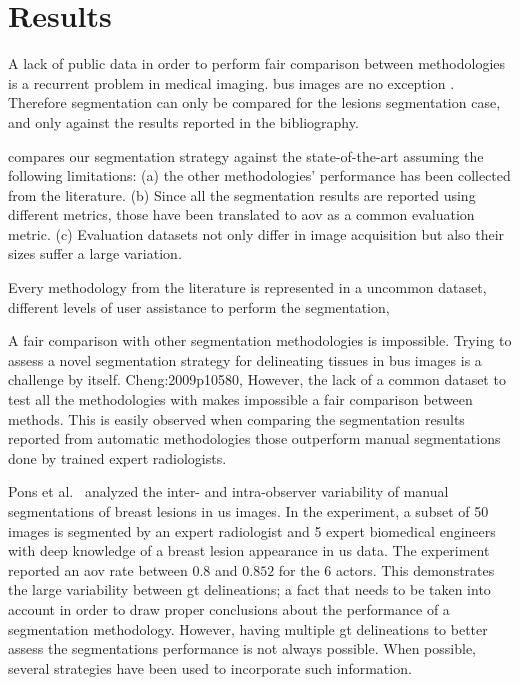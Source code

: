 \graphicspath{ {./content/results/figures/} }

\section{Results} 
A lack of public data in order to perform fair comparison between methodologies is a recurrent problem in medical imaging.
\ac{bus} images are no exception \cite{Cheng:2009p10580}. 
Therefore segmentation can only be compared for the lesions segmentation case, and only against the results reported in the bibliography.

 compares our segmentation strategy against the state-of-the-art assuming the following limitations:
(a) the other methodologies' performance has been collected from the literature. 
(b) Since all the segmentation results are reported using different metrics, those have been translated to \ac{aov} as a common evaluation metric.
(c) Evaluation datasets not only differ in image acquisition but also their sizes suffer a large variation. 

Every methodology from the literature is represented in a 
uncommon dataset, different levels of user assistance to perform the segmentation, 

A fair comparison with other segmentation methodologies is impossible. 
Trying to assess a novel segmentation strategy for delineating tissues in \ac{bus} images is a challenge by itself.
Cheng:2009p10580,
However, the lack of a common dataset to test all the methodologies with makes impossible a fair comparison between methods. This is easily observed when comparing the segmentation results reported from automatic methodologies those outperform manual segmentations done by trained expert radiologists. 

Pons et al.~\cite{gerard2013} analyzed the inter- and intra-observer variability of manual segmentations of breast lesions in \ac{us} images. In the experiment, a subset of 50 images is segmented by an expert radiologist and 5 expert biomedical engineers with deep knowledge of a breast lesion appearance in \ac{us} data. The experiment reported an \ac{aov} rate between $0.8$ and $0.852$ for the 6 actors. This demonstrates the large variability between \ac{gt} delineations; a fact that needs to be taken into account in order to draw proper conclusions about the performance of a segmentation methodology. However, having multiple \ac{gt} delineations to better assess the segmentations performance is not always possible. When possible, several strategies have been used to incorporate such information.

